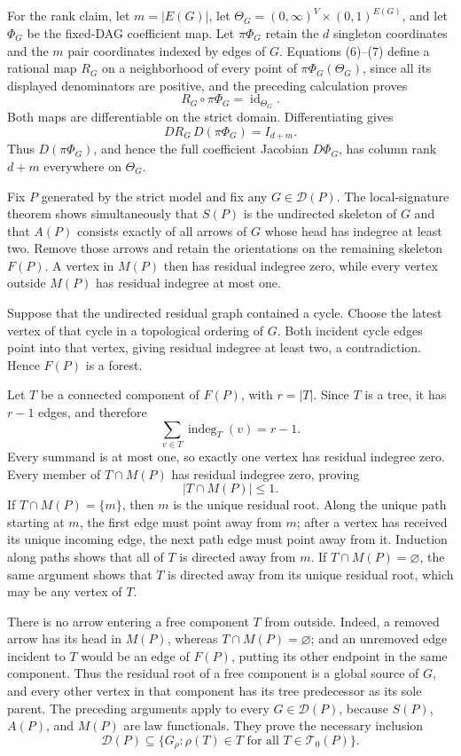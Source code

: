 For the rank claim, let \(m=|E(G)|\), let \(\Theta_G=(0,\infty)^V\times(0,1)^{E(G)}\), and let \(\Phi_G\) be the fixed-DAG coefficient map.  Let \(\pi\Phi_G\) retain the \(d\) singleton coordinates and the \(m\) pair coordinates indexed by edges of \(G\).  Equations (6)--(7) define a rational map \(R_G\) on a neighborhood of every point of \(\pi\Phi_G(\Theta_G)\), since all its displayed denominators are positive, and the preceding calculation proves
\[
 R_G\circ\pi\Phi_G=\operatorname{id}_{\Theta_G}.
\]
Both maps are differentiable on the strict domain.  Differentiating gives
\[
 D R_G\,D(\pi\Phi_G)=I_{d+m}.
\]
Thus \(D(\pi\Phi_G)\), and hence the full coefficient Jacobian \(D\Phi_G\), has column rank \(d+m\) everywhere on \(\Theta_G\).

Fix \(P\) generated by the strict model and fix any \(G\in\mathcal D(P)\).  The local-signature theorem shows simultaneously that \(S(P)\) is the undirected skeleton of \(G\) and that \(A(P)\) consists exactly of all arrows of \(G\) whose head has indegree at least two.  Remove those arrows and retain the orientations on the remaining skeleton \(F(P)\).  A vertex in \(M(P)\) then has residual indegree zero, while every vertex outside \(M(P)\) has residual indegree at most one.

Suppose that the undirected residual graph contained a cycle.  Choose the latest vertex of that cycle in a topological ordering of \(G\).  Both incident cycle edges point into that vertex, giving residual indegree at least two, a contradiction.  Hence \(F(P)\) is a forest.

Let \(T\) be a connected component of \(F(P)\), with \(r=|T|\).  Since \(T\) is a tree, it has \(r-1\) edges, and therefore
\[
 \sum_{v\in T}\operatorname{indeg}_{T}(v)=r-1.
\]
Every summand is at most one, so exactly one vertex has residual indegree zero.  Every member of \(T\cap M(P)\) has residual indegree zero, proving
\[
 |T\cap M(P)|\le 1.
\]
If \(T\cap M(P)=\{m\}\), then \(m\) is the unique residual root.  Along the unique path starting at \(m\), the first edge must point away from \(m\); after a vertex has received its unique incoming edge, the next path edge must point away from it.  Induction along paths shows that all of \(T\) is directed away from \(m\).  If \(T\cap M(P)=\varnothing\), the same argument shows that \(T\) is directed away from its unique residual root, which may be any vertex of \(T\).

There is no arrow entering a free component \(T\) from outside.  Indeed, a removed arrow has its head in \(M(P)\), whereas \(T\cap M(P)=\varnothing\); and an unremoved edge incident to \(T\) would be an edge of \(F(P)\), putting its other endpoint in the same component.  Thus the residual root of a free component is a global source of \(G\), and every other vertex in that component has its tree predecessor as its sole parent.  The preceding arguments apply to every \(G\in\mathcal D(P)\), because \(S(P)\), \(A(P)\), and \(M(P)\) are law functionals.  They prove the necessary inclusion
\[
 \mathcal D(P)\subseteq
 \{G_\rho:\rho(T)\in T\text{ for all }T\in\mathcal T_0(P)\}.
\tag{8}
\]

